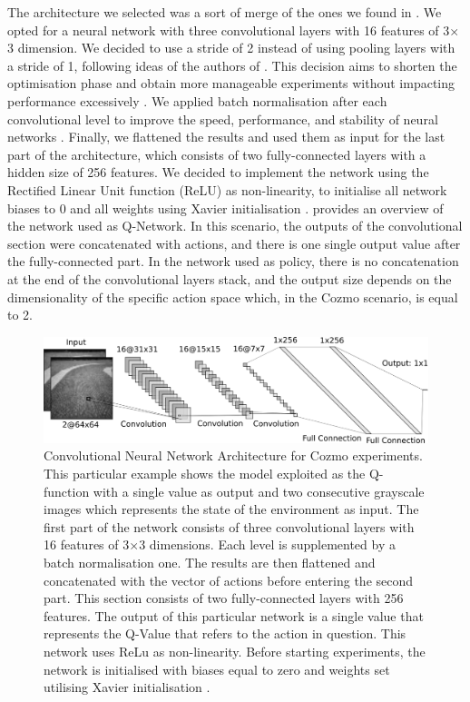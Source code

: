 The architecture we selected was a sort of merge of the ones we found in \cite{kendall2018learning,kendall2019learning,haarnoja2018alg}.
We opted for a neural network with three convolutional layers with 16 features of 3$\times$3 dimension.
We decided to use a stride of 2 instead of using pooling layers with a stride of 1, following ideas of the authors of \cite{kendall2018learning,kendall2019learning}.
This decision aims to shorten the optimisation phase and obtain more manageable experiments without impacting performance excessively \cite{springenberg2014striving}.
We applied batch normalisation after each convolutional level to improve the speed, performance, and stability of neural networks \cite{ioffe2015batch}.
Finally, we flattened the results and used them as input for the last part of the architecture, which consists of two fully-connected layers with a hidden size of 256 features.
We decided to implement the network using the Rectified Linear Unit function (ReLU) as non-linearity, to initialise all network biases to 0 and all weights using Xavier initialisation \cite{glorot2010understanding}.
 provides an overview of the network used as Q-Network.
In this scenario, the outputs of the convolutional section were concatenated with actions, and there is one single output value after the fully-connected part.
In the network used as policy, there is no concatenation at the end of the convolutional layers stack, and the output size depends on the dimensionality of the specific action space which, in the Cozmo scenario, is equal to 2.

\begin{figure}

    \centering
    \includegraphics[width=\textwidth]{img/cnn_cozmo.png}
    \caption[Convolutional Neural Network Architecture for Cozmo experiments]{ Convolutional Neural Network Architecture for Cozmo experiments.
        This particular example shows the model exploited as the Q-function with a single value as output and two consecutive grayscale images which represents the state of the environment as input.
        The first part of the network consists of three convolutional layers with 16 features of 3$\times$3 dimensions.
        Each level is supplemented by a batch normalisation one.
        The results are then flattened and concatenated with the vector of actions before entering the second part.
        This section consists of two fully-connected layers with 256 features.
        The output of this particular network is a single value that represents the Q-Value that refers to the action in question.
        This network uses ReLu as non-linearity.
        Before starting experiments, the network is initialised with biases equal to zero and weights set utilising Xavier initialisation \cite{glorot2010understanding}.}
    \label{fig:cnn_cozmo}
\end{figure}

